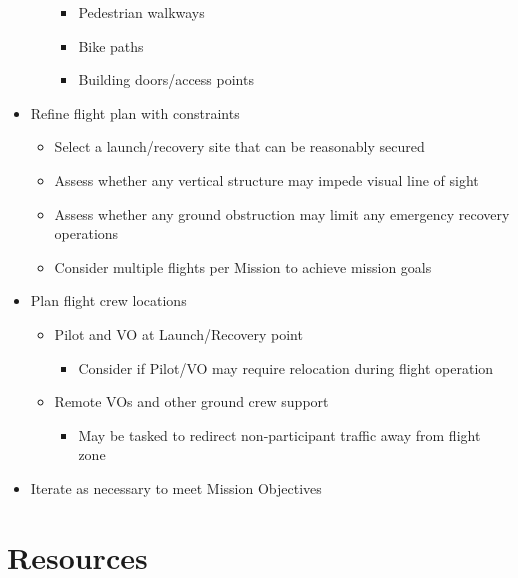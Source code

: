 \documentclass[
]{book}
\providecommand{\tightlist}{%
  \setlength{\itemsep}{0pt}\setlength{\parskip}{0pt}}
\begin{document}
\begin{itemize}
\begin{itemize}
    \begin{itemize}
    \tightlist
    \item
      Pedestrian walkways
    \item
      Bike paths
    \item
      Building doors/access points
    \end{itemize}
  \end{itemize}
\item
  Refine flight plan with constraints

  \begin{itemize}
  \tightlist
  \item
    Select a launch/recovery site that can be reasonably secured
  \item
    Assess whether any vertical structure may impede visual line of sight
  \item
    Assess whether any ground obstruction may limit any emergency recovery operations
  \item
    Consider multiple flights per Mission to achieve mission goals
  \end{itemize}
\item
  Plan flight crew locations

  \begin{itemize}
  \tightlist
  \item
    Pilot and VO at Launch/Recovery point

    \begin{itemize}
    \tightlist
    \item
      Consider if Pilot/VO may require relocation during flight operation
    \end{itemize}
  \item
    Remote VOs and other ground crew support

    \begin{itemize}
    \tightlist
    \item
      May be tasked to redirect non-participant traffic away from flight zone
    \end{itemize}
  \end{itemize}
\item
  Iterate as necessary to meet Mission Objectives
\end{itemize}

\hypertarget{resources}{%
\section{Resources}\label{resources}}
\end{document}

